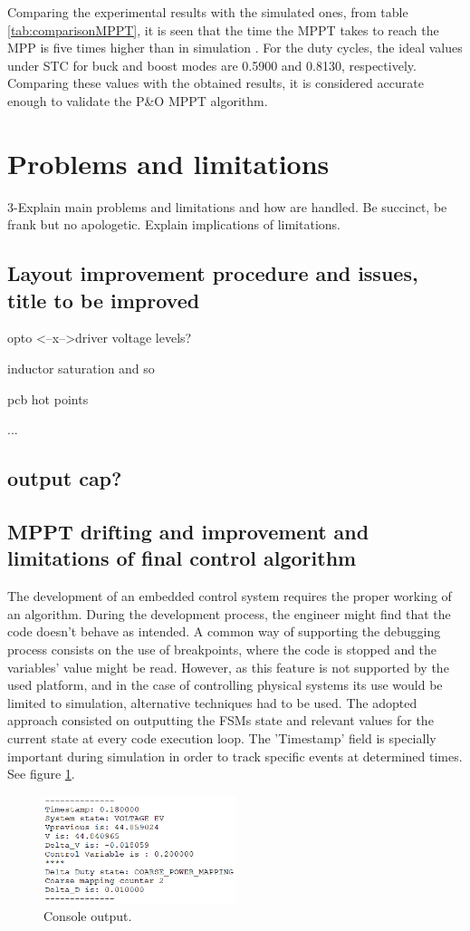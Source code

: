 Comparing the experimental results with the simulated ones, from table \ref{tab:comparisonMPPT}, it is seen that the time the MPPT takes to reach the MPP is five times higher than in simulation . For the duty cycles, the ideal values under STC for buck and boost modes are 0.5900 and 0.8130, respectively. Comparing these values with the obtained results, it is considered accurate enough to validate the P\&O MPPT algorithm.   

\section{Problems and limitations}
3-Explain main problems and limitations and how are handled. Be succinct, be frank but no apologetic. Explain implications of limitations.
\subsection{Layout improvement procedure and issues, title to be improved}
opto <--x-->driver voltage levels?

inductor saturation and so

pcb hot points

...
\subsection{output cap?}
\subsection{MPPT drifting and improvement and limitations of final control algorithm}
The development of an embedded control system requires the proper working of an algorithm. During the development process, the engineer might find that the code doesn't behave as intended. A common way of supporting the debugging process consists on the use of breakpoints, where the code is stopped and the variables' value might be read. However, as this feature is not supported by the used platform, and in the case of controlling physical systems its use would be limited to simulation, alternative techniques had to be used. The adopted approach consisted on outputting the FSMs state and relevant values for the current state at every code execution loop. The 'Timestamp' field is specially important during simulation in order to track specific events at determined times. See figure \ref{console_output}.

\begin{figure}[htbp]
	\begin{center}
		\includegraphics[width=0.5\textwidth]{../Pictures/P1/Discussion/console_output.png}
		\caption{Console output.}
		\label{console_output}
	\end{center}	
\end{figure}

